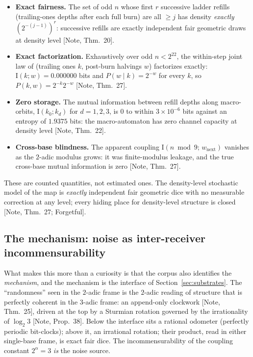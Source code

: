\documentclass[11pt]{article}
\theoremstyle{definition}
\theoremstyle{remark}
\newcommand{\anchor}[1]{\textup{[#1]}}
\newcommand{\Info}{\mathrm{I}}
\begin{document}
\begin{itemize}[leftmargin=2em]
\item \textbf{Exact fairness.} The set of odd $n$ whose first $r$ successive
ladder refills (trailing-ones depths after each full burn) are all $\geq j$
has density \emph{exactly} $(2^{-(j-1)})^r$: successive refills are exactly
independent fair geometric draws at density level \anchor{Note, Thm.~20}.
\item \textbf{Exact factorization.} Exhaustively over odd $n < 2^{22}$, the
within-step joint law of (trailing ones $k$, post-burn halvings $w$)
factorizes exactly: $\Info(k;w) = 0.000000$ bits and $P(w \mid k) = 2^{-w}$
for every $k$, so $P(k,w) = 2^{-k}2^{-w}$ \anchor{Note, Thm.~27}.
\item \textbf{Zero storage.} The mutual information between refill depths
along macro-orbits, $\Info(k_0; k_d)$ for $d=1,2,3$, is $0$ to within
$3\times 10^{-6}$ bits against an entropy of $1.9375$ bits: the macro-automaton
has zero channel capacity at density level \anchor{Note, Thm.~22}.
\item \textbf{Cross-base blindness.} The apparent coupling
$\Info(n \bmod 9;\, w_{\mathrm{next}})$ vanishes as the $2$-adic modulus
grows: it was finite-modulus leakage, and the true cross-base mutual
information is zero \anchor{Note, Thm.~27}.
\end{itemize}

These are counted quantities, not estimated ones. The density-level stochastic
model of the map is \emph{exactly} independent fair geometric dice with no
measurable correction at any level; every hiding place for density-level
structure is closed \anchor{Note, Thm.~27; Forgetful}.

\subsection{The mechanism: noise as inter-receiver incommensurability}

What makes this more than a curiosity is that the corpus also identifies the
\emph{mechanism}, and the mechanism is the interface of
Section~\ref{sec:substrates}. The ``randomness'' seen in the $2$-adic frame is
the $2$-adic reading of structure that is perfectly coherent in the $3$-adic
frame: an append-only clockwork \anchor{Note, Thm.~25}, driven at the top by a
Sturmian rotation governed by the irrationality of $\log_2 3$ \anchor{Note,
Prop.~38}. Below the interface sits a rational odometer (perfectly periodic
bit-clocks); above it, an irrational rotation; their product, read in either
single-base frame, is exact fair dice. The incommensurability of the coupling
constant $2^\alpha = 3$ \emph{is} the noise source.
\end{document}
